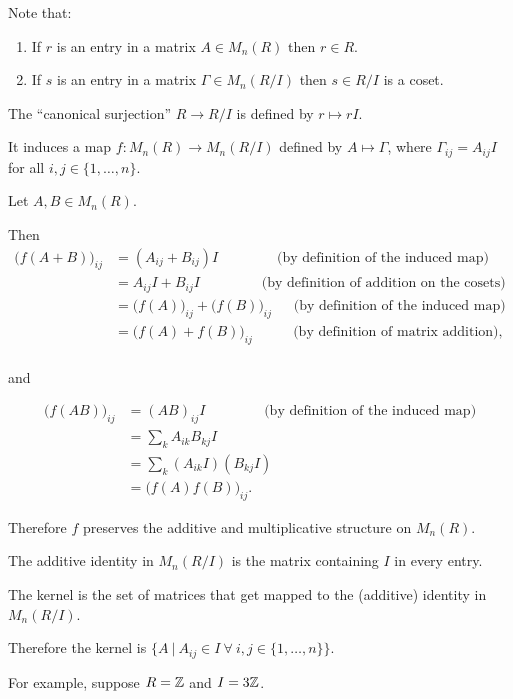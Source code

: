 \documentclass[12pt]{article}
\begin{document}
Note that:
\begin{enumerate}
\item If $r$ is an entry in a matrix $A \in M_n(R)$ then $r \in R$.
\item If $s$ is an entry in a matrix $\Gamma \in M_n(R/I)$ then $s \in R/I$ is a coset.
\end{enumerate}

The ``canonical surjection'' $R \to R/I$ is defined by $r \mapsto rI$.

It induces a map $f:M_n(R) \to M_n(R/I)$ defined by $A \mapsto \Gamma$, where
$\Gamma_{ij} = A_{ij}I$ for all $i,j \in \{1, \ldots, n\}$.

Let $A, B \in M_n(R)$.

Then
\begin{align*}
  \Big(f(A + B)\Big)_{ij}
  &= (A_{ij} + B_{ij})I ~~~~~~~~~~~~~~~~~~~\text{(by definition of the induced map)}\\
  &= A_{ij}I + B_{ij}I ~~~~~~~~~~~~~~~~~~~~\text{(by definition of addition on the cosets)}\\
  &= \Big(f(A)\Big)_{ij} + \Big(f(B)\Big)_{ij} ~~~~~~~\text{(by definition of the induced map)}\\
  &= \Big(f(A) + f(B)\Big)_{ij}~~~~~~~~~~~~~\text{(by definition of matrix addition)},\\
\end{align*}

and

\begin{align*}
  \Big(f(AB)\Big)_{ij}
  &= (AB)_{ij}I ~~~~~~~~~~~~~~~~~~~\text{(by definition of the induced map)}\\
  &= \sum_k A_{ik}B_{kj}I\\
  &= \sum_k (A_{ik}I)(B_{kj}I)\\
  &= \Big(f(A)f(B)\Big)_{ij}.
\end{align*}

Therefore $f$ preserves the additive and multiplicative structure on $M_n(R)$.


The additive identity in $M_n(R/I)$ is the matrix containing $I$ in every entry.

The kernel is the set of matrices that get mapped to the (additive) identity in $M_n(R/I)$.

Therefore the kernel is $\{A ~|~ A_{ij} \in I ~\forall~ i, j \in \{1, \ldots, n\}\}$.

For example, suppose $R = \mathbb{Z}$ and $I = 3\mathbb{Z}$.
\end{document}
